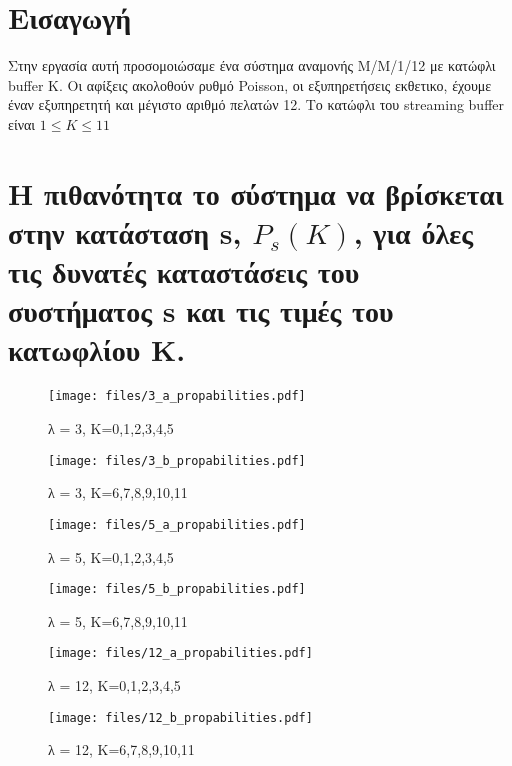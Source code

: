 









\pagebreak
\section*{Εισαγωγή}

Στην εργασία αυτή προσομοιώσαμε ένα σύστημα αναμονής M/M/1/12 με κατώφλι
buffer Κ. Οι αφίξεις ακολοθούν ρυθμό Poisson, οι εξυπηρετήσεις εκθετικο,
έχουμε έναν εξυπηρετητή και μέγιστο αριθμό πελατών 12. Το κατώφλι του
streaming buffer είναι $1 \leq K \leq 11 $

\section{Η πιθανότητα το σύστημα να βρίσκεται στην κατάσταση s, $P_s(K)$, για όλες τις
δυνατές καταστάσεις του συστήματος s και τις τιμές του κατωφλίου Κ.}

\begin{figure}[H]
    \centering
    \texttt{[image: files/3\_a\_propabilities.pdf]}
    \caption{λ = 3, K=0,1,2,3,4,5}
\end{figure}

\begin{figure}[H]
    \centering
    \texttt{[image: files/3\_b\_propabilities.pdf]}
    \caption{λ = 3, K=6,7,8,9,10,11}
\end{figure}

\begin{figure}[H]
    \centering
    \texttt{[image: files/5\_a\_propabilities.pdf]}
    \caption{λ = 5, K=0,1,2,3,4,5}
\end{figure}

\begin{figure}[H]
    \centering
    \texttt{[image: files/5\_b\_propabilities.pdf]}
    \caption{λ = 5, K=6,7,8,9,10,11}
\end{figure}

\begin{figure}[H]
    \centering
    \texttt{[image: files/12\_a\_propabilities.pdf]}
    \caption{λ = 12, K=0,1,2,3,4,5}
\end{figure}

\begin{figure}[H]
    \centering
    \texttt{[image: files/12\_b\_propabilities.pdf]}
    \caption{λ = 12, K=6,7,8,9,10,11}
\end{figure}

